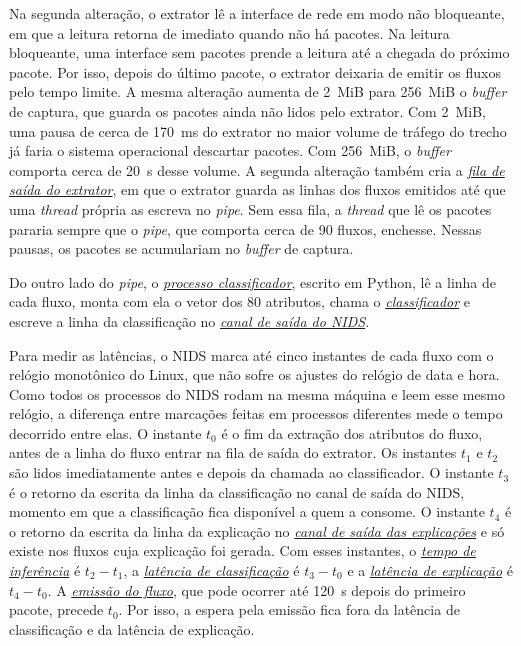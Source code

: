 \documentclass[
  12pt,
  oneside,
  a4paper,
  chapter=TITLE,
  sumario=tradicional,
  english,
  brazil
]{abntex2}
\newcommand{\termo}[2]{\hyperref[gl:#1]{\emph{#2}}}
\begin{document}
Na segunda alteração, o extrator lê a interface de rede em modo não bloqueante, em que a leitura
retorna de imediato quando não há pacotes. Na leitura bloqueante, uma interface sem pacotes prende
a leitura até a chegada do próximo pacote. Por isso, depois do último pacote, o extrator deixaria
de emitir os fluxos pelo tempo limite. A mesma alteração aumenta de 2~MiB para 256~MiB o
\emph{buffer} de captura, que guarda os pacotes ainda não lidos pelo extrator. Com 2~MiB, uma pausa
de cerca de 170~ms do extrator no maior volume de tráfego do trecho já faria o sistema operacional
descartar pacotes. Com 256~MiB, o \emph{buffer} comporta cerca de 20~s desse volume. A segunda
alteração também cria a \termo{fila-extrator}{fila de saída do extrator}, em que o extrator guarda
as linhas dos fluxos emitidos até que uma \emph{thread} própria as escreva no \emph{pipe}. Sem essa
fila, a \emph{thread} que lê os pacotes pararia sempre que o \emph{pipe}, que comporta cerca de 90
fluxos, enchesse. Nessas pausas, os pacotes se acumulariam no \emph{buffer} de captura.

Do outro lado do \emph{pipe}, o \termo{processo-classificador}{processo classificador}, escrito em
Python, lê a linha de cada fluxo, monta com ela o vetor dos 80 atributos, chama o
\termo{classificador}{classificador} e escreve a linha da classificação no
\termo{canal-nids}{canal de saída do NIDS}.

Para medir as latências, o NIDS marca até cinco instantes de cada fluxo com o relógio monotônico do
Linux, que não sofre os ajustes do relógio de data e hora. Como todos os processos do NIDS rodam na
mesma máquina e leem esse mesmo relógio, a diferença entre marcações feitas em processos diferentes
mede o tempo decorrido entre elas. O instante $t_0$ é o fim da extração dos atributos do fluxo,
antes de a linha do fluxo entrar na fila de saída do extrator. Os instantes $t_1$ e $t_2$ são lidos
imediatamente antes e depois da chamada ao classificador. O instante $t_3$ é o retorno da escrita
da linha da classificação no canal de saída do NIDS, momento em que a classificação fica disponível
a quem a consome. O instante $t_4$ é o retorno da escrita da linha da explicação no
\termo{canal-explicacoes}{canal de saída das explicações} e só existe nos fluxos cuja explicação
foi gerada. Com esses instantes, o \termo{tempo-inferencia}{tempo de inferência} é $t_2 - t_1$, a
\termo{latencia-classificacao}{latência de classificação} é $t_3 - t_0$ e a
\termo{latencia-explicacao}{latência de explicação} é $t_4 - t_0$. A \termo{emissao}{emissão do
fluxo}, que pode ocorrer até 120~s depois do primeiro pacote, precede $t_0$. Por isso, a espera pela
emissão fica fora da latência de classificação e da latência de explicação.
\end{document}
